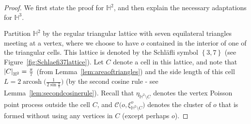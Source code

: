 \documentclass[10pt,a4paper,dvipsnames]{article}
\theoremstyle{definition}
\theoremstyle{remark}
\newcommand{\HypTwo}{{\mathbb{H}^2}}
\newcommand{\HypThree}{{\mathbb{H}^3}}
\newcommand{\C}{\mathscr {C}}
\DeclareMathOperator{\arcosh}{arcosh}
\DeclarePairedDelimiter\abs{\lvert}{\rvert}
\newcommand{\habs}[1]{\abs*{#1}_\HypTwo}
\newcommand{\orig}{o}
\numberwithin{equation}{section}
\begin{document}
\begin{proof}
    We first state the proof for $\HypTwo$, and then explain the necessary adaptations for $\HypThree$. 
    
    Partition $\HypTwo$ by the regular triangular lattice with seven equilateral triangles meeting at a vertex, where we choose to have $\orig$ contained in the interior of one of the triangular cells. This lattice is denoted by the Schl{\"a}fli symbol $\left\{3,7\right\}$ (see Figure~\ref{fig:Schlaefi37lattice}). Let $C$ denote a cell in this lattice, and note that $\habs{C}=\frac{\pi}{7}$ (from Lemma~\ref{lem:areaoftriangles}) and the side length of this cell $L=2\arcosh\big(\frac{1}{2\sin\frac{\pi}{7}}\big)$ (by the second cosine rule - see Lemma~\ref{lem:secondcosinerule}). Recall that $\eta_{\HypTwo\setminus C}$ denotes the vertex Poisson point process outside the cell $C$, and $\C\big(\orig,\xi^\orig_{\HypTwo\setminus C}\big)$ denotes the cluster of $\orig$ that is formed without using any vertices in $C$ (except perhaps $\orig$). 
    

\end{proof}
\end{document}

